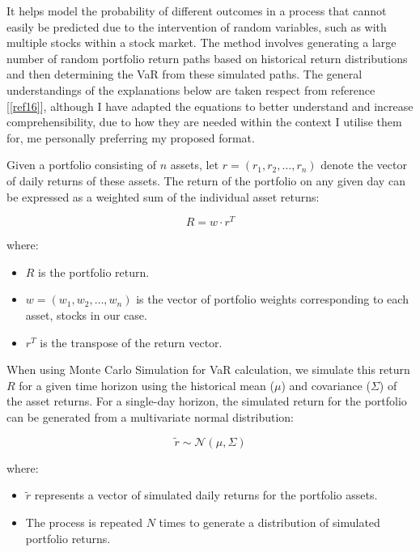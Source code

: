 \documentclass{article}
\begin{document}
It helps model the probability of different outcomes in a process that cannot easily be predicted due to the intervention of random variables, such as with multiple stocks within a stock market. The method involves generating a large number of random portfolio return paths based on historical return distributions and then determining the VaR from these simulated paths. The general understandings of the explanations below are taken respect from reference [\ref{ref16}], although I have adapted the equations to better understand and increase comprehensibility, due to how they are needed within the context I utilise them for, me personally preferring my proposed format.\\\vspace{0.3cm}

Given a portfolio consisting of \(n\) assets, let \(r = (r_1, r_2, \ldots, r_n)\) denote the vector of daily returns of these assets. The return of the portfolio on any given day can be expressed as a weighted sum of the individual asset returns:

\begin{equation}
    R = w \cdot r^T
\end{equation}

where:
\begin{itemize}
  \item \(R\) is the portfolio return.
  \item \(w = (w_1, w_2, \ldots, w_n)\) is the vector of portfolio weights corresponding to each asset, stocks in our case.
  \item \(r^T\) is the transpose of the return vector.
\end{itemize}

\vspace{0.3cm}
When using Monte Carlo Simulation for VaR calculation, we simulate this return \(R\) for a given time horizon using the historical mean (\(\mu\)) and covariance (\(\Sigma\)) of the asset returns. For a single-day horizon, the simulated return for the portfolio can be generated from a multivariate normal distribution:

\begin{equation}
  \tilde{r} \sim \mathcal{N}(\mu, \Sigma)
\end{equation}

where:
\begin{itemize}
  \item \(\tilde{r}\) represents a vector of simulated daily returns for the portfolio assets.
  \item The process is repeated \(N\) times to generate a distribution of simulated portfolio returns.
\end{itemize}
\end{document}
